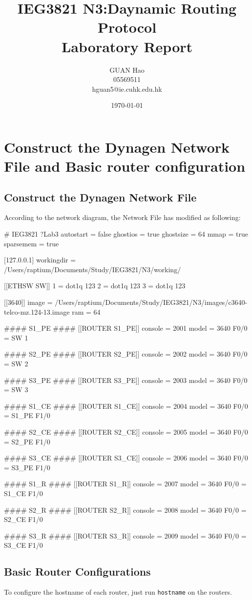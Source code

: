 \documentclass[10pt]{article}
\author{GUAN Hao\\05569511\\hguan5@ie.cuhk.edu.hk}
\title{IEG3821 N3:Daynamic Routing Protocol\\Laboratory Report}
\date{\today}
\begin{document}
\maketitle
\setcounter{section}{-1}
\section{Construct the Dynagen Network File and Basic router configuration}
\subsection{Construct the Dynagen Network File}
According to the network diagram, the Network File has modified as following:
\begin{verbatim*}
	# IEG3821 ?Lab3
	autostart = false
	ghostios = true
	ghostsize = 64
	mmap = true
	sparsemem = true

	[127.0.0.1]
	workingdir = /Users/raptium/Documents/Study/IEG3821/N3/working/

	[[ETHSW SW]]
	1 = dot1q 123
	2 = dot1q 123
	3 = dot1q 123

	[[3640]]
	image = /Users/raptium/Documents/Study/IEG3821/N3/images/c3640-telco-mz.124-13.image
	ram = 64

	#### S1_PE ####
	[[ROUTER S1_PE]]
	console = 2001
	model = 3640
	F0/0 = SW 1

	#### S2_PE ####
	[[ROUTER S2_PE]]
	console = 2002
	model = 3640
	F0/0 = SW 2

	#### S3_PE ####
	[[ROUTER S3_PE]]
	console = 2003
	model = 3640
	F0/0 = SW 3

	#### S1_CE ####
	[[ROUTER S1_CE]]
	console = 2004
	model = 3640
	F0/0 = S1_PE F1/0

	#### S2_CE ####
	[[ROUTER S2_CE]]
	console = 2005
	model = 3640
	F0/0 = S2_PE F1/0

	#### S3_CE ####
	[[ROUTER S3_CE]]
	console = 2006
	model = 3640
	F0/0 = S3_PE F1/0

	#### S1_R ####
	[[ROUTER S1_R]]
	console = 2007
	model = 3640
	F0/0 = S1_CE F1/0

	#### S2_R ####
	[[ROUTER S2_R]]
	console = 2008
	model = 3640
	F0/0 = S2_CE F1/0

	#### S3_R ####
	[[ROUTER S3_R]]
	console = 2009
	model = 3640
	F0/0 = S3_CE F1/0
\end{verbatim*}
\subsection{Basic Router Configurations} %
\label{sub:basic_router_configurations}
To configure the hostname of each router, just run {\tt hostname} on the routers.
\end{document}
